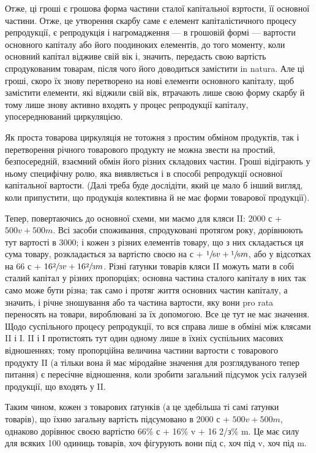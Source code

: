 \parcont{}  %
Отже, ці гроші є грошова форма частини сталої капітальної взртости,
її основної частини. Отже, це утворення скарбу саме є елемент капіталістичного
процесу репродукції, є репродукція і нагромадження — в грошовій
формі — вартости основного капіталу або його поодиноких елементів,
до того моменту, коли основний капітал відживе свій вік і, значить, передасть
свою вартість спродукованим товарам, після чого його доводиться
замістити in natura. Але ці гроші, скоро їх знову перетворено на нові
елементи основного капіталу, щоб замістити елементи, які віджили свій
вік, втрачають лише свою форму скарбу й тому лише знову активно
входять у процес репродукції капіталу, упосереднюваний циркуляцією.

Як проста товарова циркуляція не тотожня з простим обміном продуктів,
так і перетворення річного товарового продукту не можна звести на
простий, безпосередній, взаємний обмін його різних складових частин.
Гроші відіграють у ньому специфічну ролю, яка виявляється і в способі
репродукції основної капітальної вартости. (Далі треба буде дослідіти,
який це мало б інший вигляд, коли припустити, що продукція колективна
й не має форми товарової продукції).

Тепер, повертаючись до основної схеми, ми маємо для кляси II:
2000 с + $500 v + 500 m$. Всі засоби споживання, спродуковані протягом
року, дорівнюють тут вартості в 3000; і кожен з різних елементів товару,
що з них складається ця сума товару, розкладається за вартістю своєю
на  с + $\sfrac{1}{6} v + \sfrac{1}{6} m$, або у відсотках на 66 с + $16\sfrac{2}{3} v + 16\sfrac{2}{3} m$.
Різні ґатунки товарів кляси II можуть мати в собі сталий капітал у
різних пропорціях; основна частина сталого капіталу в них так само
може бути різна; так само і протяг життя основних частин капіталу, а
значить, і річне зношування або та частина вартости, яку вони pro rata
переносять на товари, вироблювані за їх допомогою. Все це тут не має
значення. Щодо суспільного процесу репродукції, то вся справа лише в
обміні між клясами II і I. II і І протистоять тут один одному лише в
їхніх суспільних масових відношеннях; тому пропорційна величина частини
вартости с товарового продукту II (а тільки вона й має міродайне
значення для розглядуваного тепер питання) є пересічне відношення, коли
зробити загальний підсумок усіх галузей продукції, що входять у II.

Таким чином, кожен з товарових ґатунків (а це здебільша ті самі
ґатунки товарів), що їхню загальну вартість підсумовано в 2000 с + $500 v +
500 m$, однаково дорівнює своєю вартістю 66\% с + 16\% v +
16 2/з\% m. Це має силу для всяких 100 одиниць товарів, хоч фігурують
вони під с, хоч під v, хоч під m.

